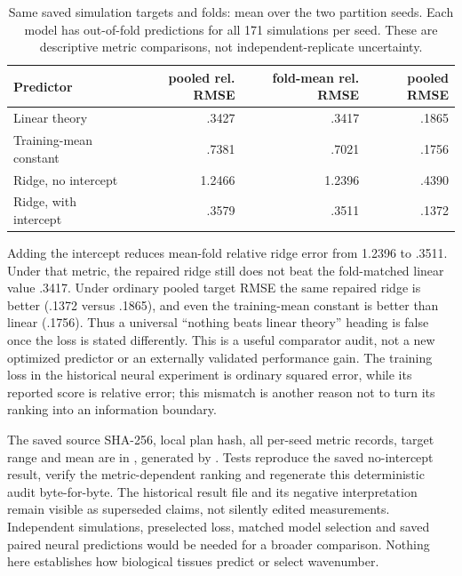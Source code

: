 \begin{table}[ht]\centering\small
\caption{Same saved simulation targets and folds: mean over the two partition seeds. Each model has out-of-fold predictions for all 171 simulations per seed. These are descriptive metric comparisons, not independent-replicate uncertainty.}
\begin{tabular}{lrrr}\toprule
Predictor & pooled rel. RMSE & fold-mean rel. RMSE & pooled RMSE\\\midrule
Linear theory & .3427 & .3417 & .1865\\
Training-mean constant & .7381 & .7021 & .1756\\
Ridge, no intercept & 1.2466 & 1.2396 & .4390\\
Ridge, with intercept & .3579 & .3511 & .1372\\\bottomrule
\end{tabular}\end{table}

Adding the intercept reduces mean-fold relative ridge error from 1.2396 to .3511. Under that metric, the repaired ridge still does not beat the fold-matched linear value .3417. Under ordinary pooled target RMSE the same repaired ridge is better (.1372 versus .1865), and even the training-mean constant is better than linear (.1756). Thus a universal ``nothing beats linear theory'' heading is false once the loss is stated differently. This is a useful comparator audit, not a new optimized predictor or an externally validated performance gain. The training loss in the historical neural experiment is ordinary squared error, while its reported score is relative error; this mismatch is another reason not to turn its ranking into an information boundary.

The saved source SHA-256, local plan hash, all per-seed metric records, target range and mean are in , generated by . Tests reproduce the saved no-intercept result, verify the metric-dependent ranking and regenerate this deterministic audit byte-for-byte. The historical result file and its negative interpretation remain visible as superseded claims, not silently edited measurements. Independent simulations, preselected loss, matched model selection and saved paired neural predictions would be needed for a broader comparison. Nothing here establishes how biological tissues predict or select wavenumber.
